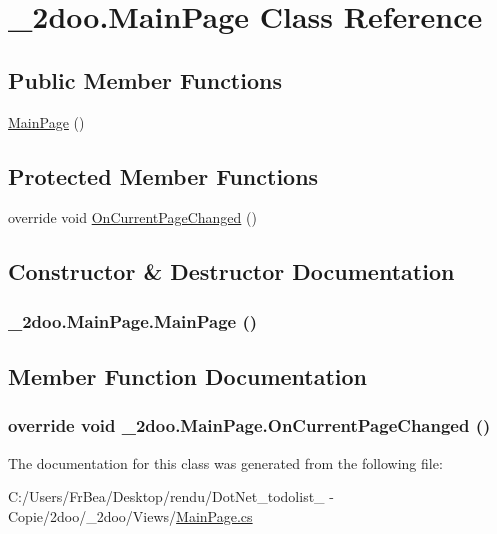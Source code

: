 \hypertarget{class__2doo_1_1_main_page}{
\section{\_\-2doo.MainPage Class Reference}
\label{class__2doo_1_1_main_page}
}
\subsection*{Public Member Functions}
\begin{CompactItemize}
\item 
\hyperlink{class__2doo_1_1_main_page_85f47dd27d57a43d6eaccfb6c29f550b}{MainPage} ()
\end{CompactItemize}
\subsection*{Protected Member Functions}
\begin{CompactItemize}
\item 
override void \hyperlink{class__2doo_1_1_main_page_f3a3d47cb261f32d809be1c25b091876}{OnCurrentPageChanged} ()
\end{CompactItemize}


\subsection{Constructor \& Destructor Documentation}
\hypertarget{class__2doo_1_1_main_page_85f47dd27d57a43d6eaccfb6c29f550b}{
\subsubsection[{MainPage}]{\setlength{\rightskip}{0pt plus 5cm}\_\-2doo.MainPage.MainPage ()}}
\label{class__2doo_1_1_main_page_85f47dd27d57a43d6eaccfb6c29f550b}




\subsection{Member Function Documentation}
\hypertarget{class__2doo_1_1_main_page_f3a3d47cb261f32d809be1c25b091876}{
\subsubsection[{OnCurrentPageChanged}]{\setlength{\rightskip}{0pt plus 5cm}override void \_\-2doo.MainPage.OnCurrentPageChanged ()}}
\label{class__2doo_1_1_main_page_f3a3d47cb261f32d809be1c25b091876}




The documentation for this class was generated from the following file:\begin{CompactItemize}
\item 
C:/Users/FrBea/Desktop/rendu/DotNet\_\-todolist\_ - Copie/2doo/\_\-2doo/Views/\hyperlink{_main_page_8cs}{MainPage.cs}\end{CompactItemize}
